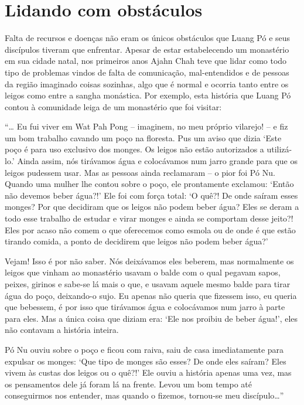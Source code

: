 \chapter{Lidando com obstáculos}

Falta de recursos e doenças não eram os únicos obstáculos que Luang Pó e
seus discípulos tiveram que enfrentar. Apesar de estar estabelecendo um
monastério em sua cidade natal, nos primeiros anos Ajahn Chah teve que
lidar como todo tipo de problemas vindos de falta de comunicação,
mal-entendidos e de pessoas da região imaginado coisas sozinhas, algo
que é normal e ocorria tanto entre os leigos como entre a sangha
monástica. Por exemplo, esta história que Luang Pó contou à comunidade
leiga de um monastério que foi visitar:

``\ldots{} Eu fui viver em Wat Pah Pong -- imaginem, no meu próprio
vilarejo! -- e fiz um bom trabalho cavando um poço na floresta. Pus um
aviso que dizia `Este poço é para uso exclusivo dos monges. Os leigos
não estão autorizados a utilizá-lo.' Ainda assim, nós tirávamos água e
colocávamos num jarro grande para que os leigos pudessem usar. Mas as
pessoas ainda reclamaram -- o pior foi Pó Nu. Quando uma mulher lhe
contou sobre o poço, ele prontamente exclamou: `Então não devemos beber
água?!' Ele foi com força total: `O quê?! De onde saíram esses monges?
Por que decidiram que os leigos não podem beber água? Eles se deram a
todo esse trabalho de estudar e virar monges e ainda se comportam desse
jeito?! Eles por acaso não comem o que oferecemos como esmola ou de onde
é que estão tirando comida, a ponto de decidirem que leigos não podem
beber água?'

Vejam! Isso é por não saber. Nós deixávamos eles beberem, mas
normalmente os leigos que vinham ao monastério usavam o balde com o qual
pegavam sapos, peixes, girinos e sabe-se lá mais o que, e usavam aquele
mesmo balde para tirar água do poço, deixando-o sujo. Eu apenas não
queria que fizessem isso, eu queria que bebessem, é por isso que
tirávamos água e colocávamos num jarro à parte para eles. Mas a única
coisa que diziam era: `Ele nos proibiu de beber água!', eles não
contavam a história inteira.

Pó Nu ouviu sobre o poço e ficou com raiva, saiu de casa imediatamente
para expulsar os monges: `Que tipo de monges são esses? De onde eles
saíram? Eles vivem às custas dos leigos ou o quê?!' Ele ouviu a história
apenas uma vez, mas os pensamentos dele já foram lá na frente. Levou um
bom tempo até conseguirmos nos entender, mas quando o fizemos, tornou-se
meu discípulo\ldots{}''


